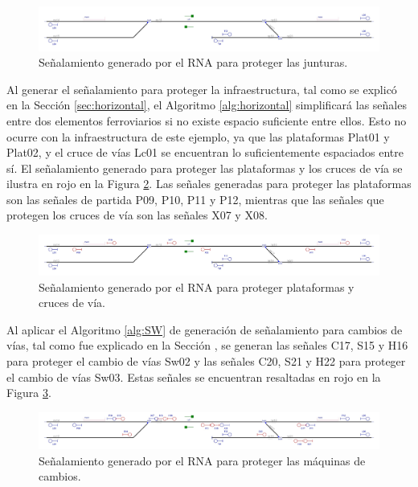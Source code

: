 	\begin{figure}[H]
		\centering
		\includegraphics[width=1\textwidth]{resultados-obtenidos/ejemplo2/images/2_step2.png}
		\centering\caption{Señalamiento generado por el RNA para proteger las junturas.}
		\label{fig:EJ2_4}
	\end{figure}
	
	Al generar el señalamiento para proteger la infraestructura, tal como se explicó en la Sección \ref{sec:horizontal}, el Algoritmo \ref{alg:horizontal} simplificará las señales entre dos elementos ferroviarios si no existe espacio suficiente entre ellos. Esto no ocurre con la infraestructura de este ejemplo, ya que las plataformas Plat01 y Plat02, y el cruce de vías Lc01 se encuentran lo suficientemente espaciados entre sí. El señalamiento generado para proteger las plataformas y los cruces de vía se ilustra en rojo en la Figura \ref{fig:EJ2_5}. Las señales generadas para proteger las plataformas son las señales de partida P09, P10, P11 y P12, mientras que las señales que protegen los cruces de vía son las señales X07 y X08.
	
	\begin{figure}[H]
		\centering
		\includegraphics[width=1\textwidth]{resultados-obtenidos/ejemplo2/images/2_step3.png}
		\centering\caption{Señalamiento generado por el RNA para proteger plataformas y cruces de vía.}
		\label{fig:EJ2_5}
	\end{figure}

	Al aplicar el Algoritmo \ref{alg:SW} de generación de señalamiento para cambios de vías, tal como fue explicado en la Sección \label{sec:signal_switches}, se generan las señales C17, S15 y H16 para proteger el cambio de vías Sw02 y las señales C20, S21 y H22 para proteger el cambio de vías Sw03. Estas señales se encuentran resaltadas en rojo en la Figura \ref{fig:EJ2_6}.

	 \begin{figure}[H]
		\centering
		\includegraphics[width=1\textwidth]{resultados-obtenidos/ejemplo2/images/2_step4.png}
		\centering\caption{Señalamiento generado por el RNA para proteger las máquinas de cambios.}
		\label{fig:EJ2_6}
	\end{figure}

